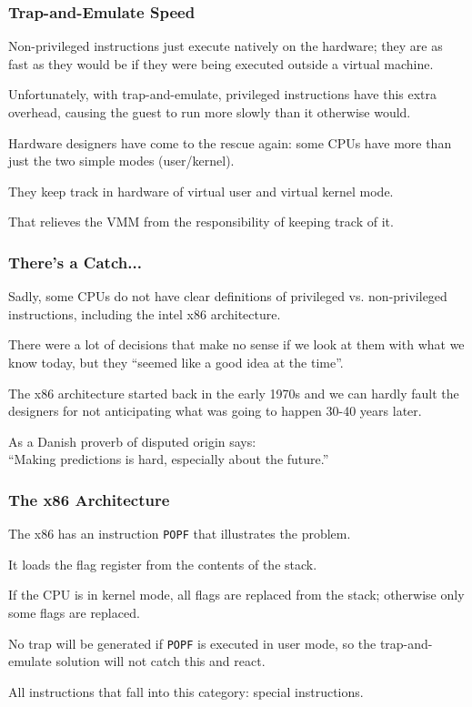 \begin{frame}
\frametitle{Trap-and-Emulate Speed}

Non-privileged instructions just execute natively on the hardware; they are as fast as they would be if they were being executed outside a virtual machine. 

Unfortunately, with trap-and-emulate, privileged instructions have this extra overhead, causing the guest to run more slowly than it otherwise would. 

Hardware designers have come to the rescue again: some CPUs have more than just the two simple modes (user/kernel).

They keep track in hardware of virtual user and virtual kernel mode. 

That relieves the VMM from the responsibility of keeping track of it.


\end{frame}

\begin{frame}
\frametitle{There's a Catch...}

Sadly, some CPUs do not have clear definitions of privileged vs. non-privileged instructions, including the intel x86 architecture. 

There were a lot of decisions that make no sense if we look at them with what we know today, but they ``seemed like a good idea at the time''. 

The x86 architecture started back in the early 1970s and we can hardly fault the designers for not anticipating what was going to happen 30-40 years later. 

As a Danish proverb of disputed origin says:\\
\quad ``Making predictions is hard, especially about the future.''


\end{frame}

\begin{frame}
\frametitle{The x86 Architecture}

The x86 has an instruction \texttt{POPF} that illustrates the problem. 

It loads the flag register from the contents of the stack. 

If the CPU is in kernel mode, all flags are replaced from the stack; otherwise only some flags are replaced. 

No trap will be generated if \texttt{POPF} is executed in user mode, so the trap-and-emulate solution will not catch this and react. 

All instructions that fall into this category: \alert{special instructions}.

\end{frame}

